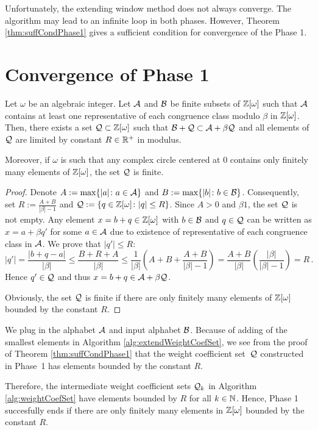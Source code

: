 Unfortunately, the extending window method does not always converge. The algorithm may lead to an infinite loop in both phases. 
However, Theorem \ref{thm:suffCondPhase1} gives a sufficient condition for convergence of the Phase 1. 

\section{Convergence of Phase 1}
\label{sec:convergencePhase1}
\begin{theo}
\label{thm:suffCondPhase1}
    Let $\omega$ be an algebraic integer. Let $\mathcal{A}$ and $\mathcal{B}$ be finite subsets of $\mathbb{Z}[\omega]$ such that $\mathcal{A}$ contains at least one representative of each congruence class modulo $\beta$ in $\mathbb{Z}[\omega]$. Then, there exists a set $\mathcal{Q}\subset\mathbb{Z}[\omega]$ such that $ \mathcal{B} + \mathcal{Q} \subset \mathcal{A} + \beta \mathcal{Q}$ and all elements of $\mathcal{Q}$ are limited by constant $R\in \mathbb{R}^+$ in modulus.
    
    Moreover, if $\omega$ is such that any complex circle centered at 0 contains only finitely  many elements of $\mathbb{Z}[\omega]$, the set $\mathcal{Q}$ is finite. 
\end{theo}
\begin{proof}
 Denote $A:=\max\{|a|\colon a \in \mathcal{A}\}$ and $B:=\max\{|b|\colon b\in\mathcal{B}\}$. Consequently, set $R:=\frac{A+B}{|\beta|-1}$ and $\mathcal{Q}:=\{q\in\mathbb{Z}[\omega]\colon |q|\leq R\}$. Since $A>0$ and $\beta1$, the set $\mathcal{Q}$ is not empty. Any element $x=b+q \in \mathbb{Z}[\omega]$ with $b\in\mathcal{B}$ and $q\in\mathcal{Q}$ can be written as $x=a+\beta q'$ for some $a\in\mathcal{A}$ due to existence of representative of each congruence class in $\mathcal{A}$. We prove that $|q'|\leq R$:
 $$
    |q'|=\frac{|b+q-a|}{|\beta|}\leq \frac{B+R+A}{|\beta|} \leq \frac{1}{|\beta|}\left(A+B+\frac{A+B}{|\beta|-1}\right)  =\frac{A+B}{|\beta|}\left(\frac{|\beta|}{|\beta|-1}\right)=R\,.
 $$ 
 Hence $q'\in\mathcal{Q}$ and thus  $x=b+q \in \mathcal{A} + \beta \mathcal{Q}$. 
 
 Obviously, the set $\mathcal{Q}$ is finite if there are only finitely many elements of $\mathbb{Z}[\omega]$ bounded by the constant $R$.
\end{proof}
We plug in the alphabet $\mathcal{A}$ and input alphabet $\mathcal{B}$. Because of adding of the smallest elements in Algorithm \ref{alg:extendWeightCoefSet}, we see from the proof of Theorem \ref{thm:suffCondPhase1} that the weight coefficient set~$\mathcal{Q}$ constructed in Phase~1 has elements bounded by the constant $R$. 

Therefore, the intermediate weight coefficient sets $\mathcal{Q}_k$ in Algorithm \ref{alg:weightCoefSet} have elements bounded by $R$ for all $k\in\mathbb{N}$. Hence, Phase 1 succesfully ends if there are only finitely many elements in $\mathbb{Z}[\omega]$ bounded by the constant $R$. 


